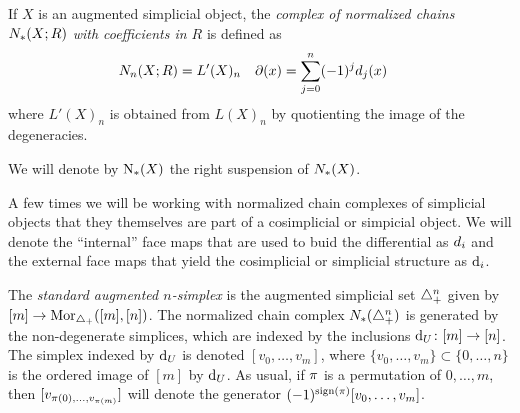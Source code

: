 If $X$ is an augmented simplicial object, the \emph{complex of normalized chains $\cadenas(X;R)$ with coefficients in $R$} is defined as
\begin{align*}
	\cadenas[n](X;R) &= L'(X)_n
	&
	\partial(x) &= \sum_{j=0}^{n} (-1)^jd_j(x)
\end{align*}
where $L'(X)_n$ is obtained from $L(X)_n$ by quotienting the image of the degeneracies.
\begin{notation}\label{notation:chains}
	We will denote by $\chains(X)$ the right suspension of $\cadenas(X)$.
\end{notation}

\begin{notation}
	A few times we will be working with normalized chain complexes of simplicial objects that they themselves are part of a cosimplicial or simpicial object. We will denote the ``internal'' face maps that are used to buid the differential as $\diff_i$ and the external face maps that yield the cosimplicial or simplicial structure as $\d_i$.
\end{notation}





The \emph{standard augmented $n$-simplex} is the augmented simplicial set $\simplex^n_+$ given by $[m]\to \mathrm{Mor}_{\asimplex}([m],[n])$. The normalized chain complex $\cadenas(\asimplex^n)$ is generated by the non-degenerate simplices, which are indexed by the inclusions $\d_U\colon [m]\to [n]$. The simplex indexed by $\d_U$ is denoted $[v_0,\ldots,v_{m}]$, where $\{v_0,\ldots,v_{m}\}\subset \{0,\ldots,n\}$ is the ordered image of $[m]$ by $\d_U$. As usual, if $\perm$ is a permutation of $0,\ldots,m$, then $[v_{\perm(0),\ldots,v_{\perm(m)}}]$ will denote the generator $(-1)^{\sign{\perm}}[v_0,\ldots,v_m]$.

%

